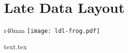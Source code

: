 \chapter{Late Data Layout}
\label{chapter:ldl}

\begin{wrapfigure}{r}{40mm}
  \centering
  \vspace{-27em}
  \texttt{[image: ldl-frog.pdf]}
  \vspace{-27em}
\end{wrapfigure}

{text.tex}

%
%
%
%
%
%
%
